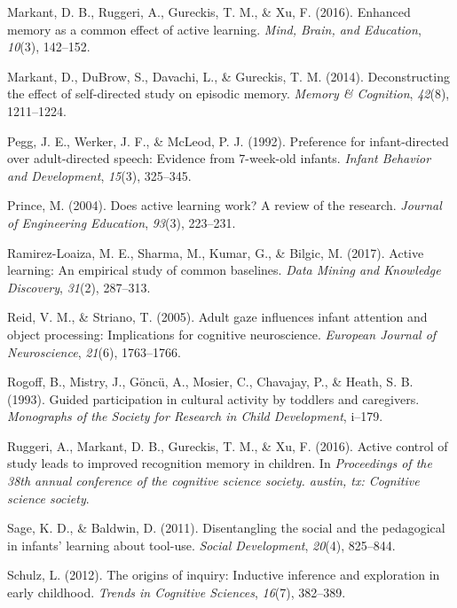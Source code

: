 \documentclass[a4paper,man,apacite,floatsintext]{apa6}
\begin{document}
\hypertarget{ref-markant2016enhanced}{}
Markant, D. B., Ruggeri, A., Gureckis, T. M., \& Xu, F. (2016). Enhanced
memory as a common effect of active learning. \emph{Mind, Brain, and
Education}, \emph{10}(3), 142--152.

\hypertarget{ref-markant2014deconstructing}{}
Markant, D., DuBrow, S., Davachi, L., \& Gureckis, T. M. (2014).
Deconstructing the effect of self-directed study on episodic memory.
\emph{Memory \& Cognition}, \emph{42}(8), 1211--1224.

\hypertarget{ref-pegg1992preference}{}
Pegg, J. E., Werker, J. F., \& McLeod, P. J. (1992). Preference for
infant-directed over adult-directed speech: Evidence from 7-week-old
infants. \emph{Infant Behavior and Development}, \emph{15}(3), 325--345.

\hypertarget{ref-prince2004does}{}
Prince, M. (2004). Does active learning work? A review of the research.
\emph{Journal of Engineering Education}, \emph{93}(3), 223--231.

\hypertarget{ref-ramirez2017active}{}
Ramirez-Loaiza, M. E., Sharma, M., Kumar, G., \& Bilgic, M. (2017).
Active learning: An empirical study of common baselines. \emph{Data
Mining and Knowledge Discovery}, \emph{31}(2), 287--313.

\hypertarget{ref-reid2005adult}{}
Reid, V. M., \& Striano, T. (2005). Adult gaze influences infant
attention and object processing: Implications for cognitive
neuroscience. \emph{European Journal of Neuroscience}, \emph{21}(6),
1763--1766.

\hypertarget{ref-rogoff1993guided}{}
Rogoff, B., Mistry, J., Göncü, A., Mosier, C., Chavajay, P., \& Heath,
S. B. (1993). Guided participation in cultural activity by toddlers and
caregivers. \emph{Monographs of the Society for Research in Child
Development}, i--179.

\hypertarget{ref-ruggeri2016active}{}
Ruggeri, A., Markant, D. B., Gureckis, T. M., \& Xu, F. (2016). Active
control of study leads to improved recognition memory in children. In
\emph{Proceedings of the 38th annual conference of the cognitive science
society. austin, tx: Cognitive science society}.

\hypertarget{ref-sage2011disentangling}{}
Sage, K. D., \& Baldwin, D. (2011). Disentangling the social and the
pedagogical in infants' learning about tool-use. \emph{Social
Development}, \emph{20}(4), 825--844.

\hypertarget{ref-schulz2012origins}{}
Schulz, L. (2012). The origins of inquiry: Inductive inference and
exploration in early childhood. \emph{Trends in Cognitive Sciences},
\emph{16}(7), 382--389.
\end{document}
